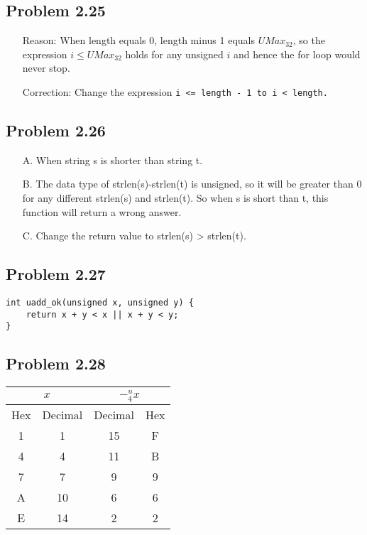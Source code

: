 \documentclass[a4paper]{article}
\begin{document}
\subsection*{Problem 2.25}
\begin{enumerate}
\item []Reason: When length equals 0, length minus 1 equals $UMax_{32}$, so the expression $i \le UMax_{32}$ holds for any unsigned $i$ and hence the for loop would never stop.
\item []Correction: Change the expression \tt{i <= length - 1} \textrm{to} \tt{i < length}.
\end{enumerate}

\subsection*{Problem 2.26}
\begin{enumerate}
    \item [A.] When string s is shorter than string t.
    \item [B.] The data type of {strlen(s)-strlen(t)} is unsigned, so it will be greater than 0 for any different strlen(s) and strlen(t). So when s is short than t, this function will return a wrong answer.
    \item [C.] Change the return value to strlen(s) > strlen(t).
\end{enumerate}

\subsection*{Problem 2.27}
\begin{lstlisting}
int uadd_ok(unsigned x, unsigned y) {
    return x + y < x || x + y < y;
}
\end{lstlisting}

\subsection*{Problem 2.28}
\begin{tabular}{c|c|c|c}
    \multicolumn{2}{c|}{$x$}&\multicolumn{2}{c}{$-^u_4x$}\\
    \hline
    Hex&Decimal&Decimal&Hex\\
    \hline
    1&1&15&F\\
    4&4&11&B\\
    7&7&9&9\\
    A&10&6&6\\
    E&14&2&2\\

\end{tabular}
\end{document}
